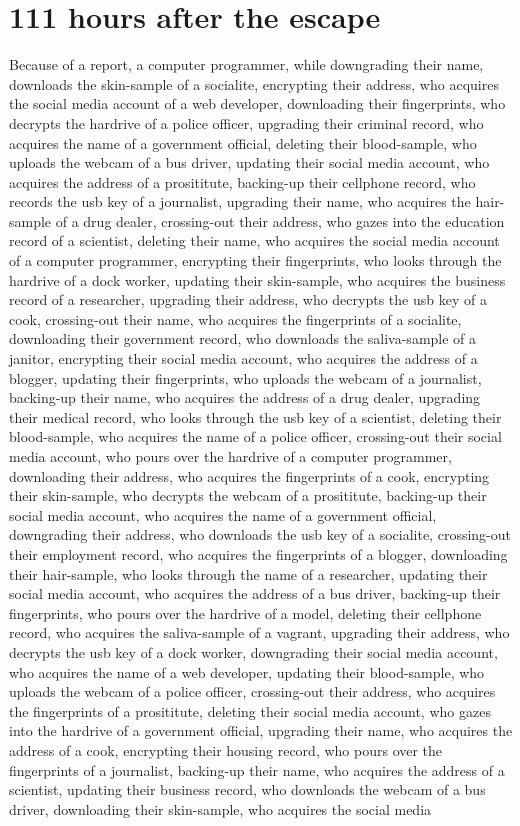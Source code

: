 \documentclass{report}
\begin{document}
\section*{111 \small{hours after the escape}}

Because of a report, a computer programmer, while downgrading their name, downloads the skin-sample of a socialite, encrypting their address, who acquires the social media account of a web developer, downloading their fingerprints, who decrypts the hardrive of a police officer, upgrading their criminal record, who acquires the name of a government official, deleting their blood-sample, who uploads the webcam of a bus driver, updating their social media account, who acquires the address of a prosititute, backing-up their cellphone record, who records the usb key of a journalist, upgrading their name, who acquires the hair-sample of a drug dealer, crossing-out their address, who gazes into the education record of a scientist, deleting their name, who acquires the social media account of a computer programmer, encrypting their fingerprints, who looks through the hardrive of a dock worker, updating their skin-sample, who acquires the business record of a researcher, upgrading their address, who decrypts the usb key of a cook, crossing-out their name, who acquires the fingerprints of a socialite, downloading their government record, who downloads the saliva-sample of a janitor, encrypting their social media account, who acquires the address of a blogger, updating their fingerprints, who uploads the webcam of a journalist, backing-up their name, who acquires the address of a drug dealer, upgrading their medical record, who looks through the usb key of a scientist, deleting their blood-sample, who acquires the name of a police officer, crossing-out their social media account, who pours over the hardrive of a computer programmer, downloading their address, who acquires the fingerprints of a cook, encrypting their skin-sample, who decrypts the webcam of a prosititute, backing-up their social media account, who acquires the name of a government official, downgrading their address, who downloads the usb key of a socialite, crossing-out their employment record, who acquires the fingerprints of a blogger, downloading their hair-sample, who looks through the name of a researcher, updating their social media account, who acquires the address of a bus driver, backing-up their fingerprints, who pours over the hardrive of a model, deleting their cellphone record, who acquires the saliva-sample of a vagrant, upgrading their address, who decrypts the usb key of a dock worker, downgrading their social media account, who acquires the name of a web developer, updating their blood-sample, who uploads the webcam of a police officer, crossing-out their address, who acquires the fingerprints of a prosititute, deleting their social media account, who gazes into the hardrive of a government official, upgrading their name, who acquires the address of a cook, encrypting their housing record, who pours over the fingerprints of a journalist, backing-up their name, who acquires the address of a scientist, updating their business record, who downloads the webcam of a bus driver, downloading their skin-sample, who acquires the social media 
\end{document}
